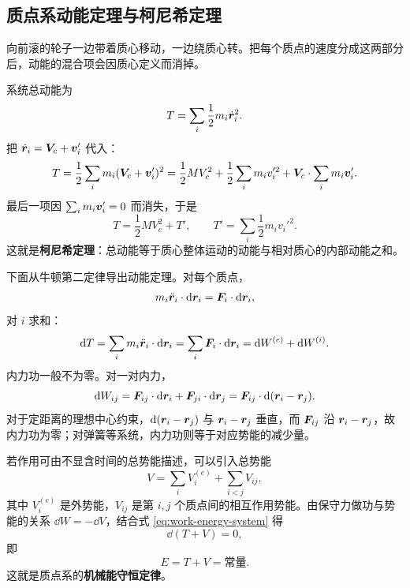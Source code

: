 \subsection{质点系动能定理与柯尼希定理}

向前滚的轮子一边带着质心移动，一边绕质心转。把每个质点的速度分成这两部分后，动能的混合项会因质心定义而消掉。

系统总动能为
\begin{equation}
T=\sum_i\frac12 m_i\dot{\boldsymbol{r}}_i^2 .
\end{equation}
把 $\dot{\boldsymbol{r}}_i=\boldsymbol{V}_c+\boldsymbol{v}_i'$ 代入：
\begin{equation}
T=\frac12\sum_i m_i(\boldsymbol{V}_c+\boldsymbol{v}_i')^2
=\frac12MV_c^2+\frac12\sum_i m_i v_i'^2
+\boldsymbol{V}_c\cdot\sum_i m_i\boldsymbol{v}_i'.
\end{equation}
最后一项因 $\sum_i m_i\boldsymbol{v}_i'=0$ 而消失，于是
\begin{equation}
T=\frac12MV_c^2+T',\qquad
T'=\sum_i\frac12 m_i v_i'^2 .
\label{eq:koenig-ch1}
\end{equation}
这就是\textbf{柯尼希定理}：总动能等于质心整体运动的动能与相对质心的内部动能之和。

下面从牛顿第二定律导出动能定理。对每个质点，
\begin{equation}
m_i\ddot{\boldsymbol{r}}_i\cdot\mathrm{d}\boldsymbol{r}_i=\boldsymbol{F}_i\cdot\mathrm{d}\boldsymbol{r}_i,
\end{equation}
对 $i$ 求和：
\begin{equation}
\mathrm{d} T=\sum_i m_i\ddot{\boldsymbol{r}}_i\cdot\mathrm{d}\boldsymbol{r}_i
=\sum_i\boldsymbol{F}_i\cdot\mathrm{d}\boldsymbol{r}_i
=\mathrm{d} W^{(e)}+\mathrm{d} W^{(i)}.
\label{eq:work-energy-system}
\end{equation}
内力功一般不为零。对一对内力，
\begin{equation}
\mathrm{d} W_{ij}
=\boldsymbol{F}_{ij}\cdot\mathrm{d}\boldsymbol{r}_i+\boldsymbol{F}_{ji}\cdot\mathrm{d}\boldsymbol{r}_j
=\boldsymbol{F}_{ij}\cdot\mathrm{d}(\boldsymbol{r}_i-\boldsymbol{r}_j).
\end{equation}
对于定距离的理想中心约束，$\mathrm{d}(\boldsymbol{r}_i-\boldsymbol{r}_j)$ 与 $\boldsymbol{r}_i-\boldsymbol{r}_j$ 垂直，而 $\boldsymbol{F}_{ij}$ 沿 $\boldsymbol{r}_i-\boldsymbol{r}_j$，故内力功为零；对弹簧等系统，内力功则等于对应势能的减少量。

若作用可由不显含时间的总势能描述，可以引入总势能
\begin{equation}
V=\sum_i V_i^{(e)}+\sum_{i<j}V_{ij},
\end{equation}
其中 $V_i^{(e)}$ 是外势能，$V_{ij}$ 是第 $i,j$ 个质点间的相互作用势能。由保守力做功与势能的关系 $\dd W=-\dd V$，结合式 \eqref{eq:work-energy-system} 得
\begin{equation}
\dd(T+V)=0,
\end{equation}
即
\begin{equation}
E=T+V=\text{常量}.
\end{equation}
这就是质点系的\textbf{机械能守恒定律}。

